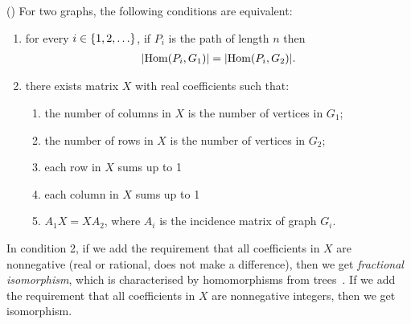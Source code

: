 \begin{theorem}\label{thm:grohe}(\cite[Theorem 2]{groheDellRattan2018})
    For two graphs, the following conditions are equivalent:
    \begin{enumerate}
        \item for every $i \in \{1,2,\ldots\}$, if $P_i$ is the path of length $n$ then
        \begin{align*}
        |\mathrm {Hom}(P_i,G_1) | = |\mathrm {Hom}(P_i,G_2)|.
        \end{align*}
        \item there exists matrix $X$ with real coefficients such that:
        \begin{enumerate}
            \item the number of columns in $X$ is the number of vertices in $G_1$;
            \item the number of rows in $X$ is the number of vertices in $G_2$;
            \item each row in $X$ sums up to 1
            \item each column in $X$ sums up to 1
            \item $A_1 X = X A_2$, where $A_i$ is the incidence matrix of graph $G_i$.
        \end{enumerate}
    \end{enumerate}
\end{theorem}
In condition 2, if we add the requirement that all coefficients in $X$ are nonnegative (real or rational, does not make a difference), then we get  \emph{fractional isomorphism}, which is characterised by homomorphisms from trees~\cite[Theorem 1]{groheDellRattan2018}. If we add the requirement that all coefficients in $X$ are nonnegative integers, then we get isomorphism.  

